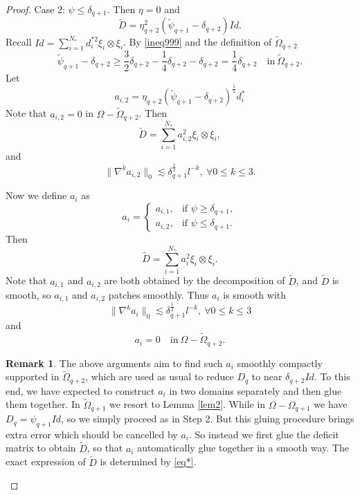 \documentclass[reqno,12pt]{amsart}
\numberwithin{equation}{section}
\theoremstyle{plain}
\theoremstyle{definition}
\newtheorem{rem}[thm]{Remark}
\begin{document}
\begin{proof}
Case 2: $\psi\le\delta_{q+1}$. Then $\eta=0$ and
\begin{equation*}
    \tilde D = \eta_{q+2}^2(\tilde\psi_{q+1} -\delta_{q+2})Id.
\end{equation*}
Recall $Id = \sum_{i=1}^{N_*}d_i^{*2}\xi_i\otimes\xi_i$. By \eqref{ineq999} and the definition of $\tilde\Omega_{q+2}$
\begin{equation}
    \tilde\psi_{q+1}-\delta_{q+2}\ge \frac{3}{2}\delta_{q+2}-\frac{1}{4}\delta_{q+2}-\delta_{q+2}=\frac{1}{4} \delta_{q+2}\quad\text{in}\ \tilde\Omega_{q+2}.
\end{equation}
Let
\begin{equation*}
    a_{i,2}= \eta_{q+2}(\tilde\psi_{q+1} -\delta_{q+2})^{\frac{1}{2}}d_i^*
\end{equation*}
Note that $a_{i,2}=0$ in $\Omega-\tilde\Omega_{q+2}$. Then
\begin{equation*}
    \tilde D=\sum_{i=1}^{N_*} a_{i,2}^2\xi_i\otimes\xi_i,
\end{equation*}
and
\begin{equation*}
    \|\nabla^k a_{i,2}\|_0 \lesssim \delta_{q+1}^\frac{1}{2}l^{-k},\ \forall 0\le k\le 3.
\end{equation*}

Now we define $a_i$ as
\begin{equation}
    a_i = \begin{cases}
        a_{i,1}, & \text{if }\psi\ge \delta_{q+1},\\
        a_{i,2}, &\text{if }\psi\le\delta_{q+1}.
    \end{cases}
\end{equation}
Then
\begin{equation}
    \tilde D=\sum_{i=1}^{N_*} a_i^2\xi_i\otimes\xi_i.
\end{equation}
Note that $a_{i,1}$ and $a_{i,2}$ are both obtained by the decomposition of $\tilde D$, and $\tilde D$ is smooth, so $a_{i,1}$ and $a_{i,2}$ patches smoothly. Thus $a_i$ is smooth with
\begin{equation*}
    \|\nabla^k a_i\|_0
    \lesssim \delta_{q+1}^\frac{1}{2}l^{-k},\ \forall 0\le k\le 3
\end{equation*}
and
\begin{equation}
    a_i=0\quad\text{in}\ \Omega-\tilde\Omega_{q+2}. \label{a-i}
\end{equation}
\begin{rem}\label{rem995}
    The above arguments aim to find such $a_i$ smoothly compactly supported in $\tilde\Omega_{q+2}$, which are used as usual to reduce $D_q$ to near $\delta_{q+2}Id$. To this end, we have expected to construct $a_i$ in two domains separately and then glue them together. In $\tilde\Omega_{q+1}$ we resort to Lemma \ref{lem2}. While in $\Omega-\Omega_{q+1}$ we have $D_q=\psi_{q+1}Id$, so we simply  proceed as in Step 2. But this gluing procedure brings extra error which should be cancelled by $a_i$. So instead we first glue the deficit matrix to obtain $\tilde D$, so that $a_i$ automatically glue together in a smooth way. The exact expression of $\tilde D$ is determined by \eqref{eq*}.
\end{rem}



\end{proof}
\end{document}
